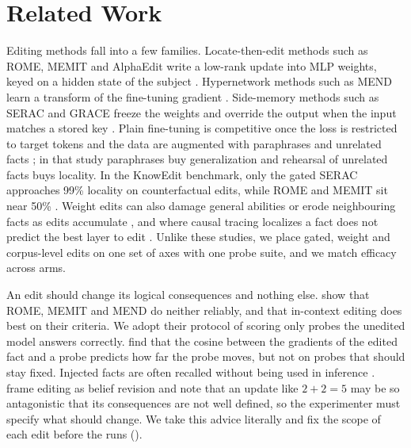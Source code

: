 \section{Related Work}
\label{sec:related}

Editing methods fall into a few families.
Locate-then-edit methods such as ROME, MEMIT and AlphaEdit write a low-rank update into MLP weights, keyed on a hidden state of the subject \citep{meng2022rome,meng2023memit,fang2025alphaedit}.
Hypernetwork methods such as MEND learn a transform of the fine-tuning gradient \citep{mitchell2022mend}.
Side-memory methods such as SERAC and GRACE freeze the weights and override the output when the input matches a stored key \citep{mitchell2022serac,hartvigsen2023grace}.
Plain fine-tuning is competitive once the loss is restricted to target tokens and the data are augmented with paraphrases and unrelated facts \citep{gangadhar2024finetuning}; in that study paraphrases buy generalization and rehearsal of unrelated facts buys locality.
In the KnowEdit benchmark, only the gated SERAC approaches 99\% locality on counterfactual edits, while ROME and MEMIT sit near 50\% \citep{zhang2024knowedit}.
Weight edits can also damage general abilities or erode neighbouring facts as edits accumulate \citep{gupta2024catastrophic,yang2024butterfly,gu2024harms}, and where causal tracing localizes a fact does not predict the best layer to edit \citep{hase2023localization}.
Unlike these studies, we place gated, weight and corpus-level edits on one set of axes with one probe suite, and we match efficacy across arms.

An edit should change its logical consequences and nothing else.
\citet{cohen2024ripple} show that ROME, MEMIT and MEND do neither reliably, and that in-context editing does best on their criteria.
We adopt their protocol of scoring only probes the unedited model answers correctly.
\citet{qin2024ripple} find that the cosine between the gradients of the edited fact and a probe predicts how far the probe moves, but not on probes that should stay fixed.
Injected facts are often recalled without being used in inference \citep{onoe2023entities,zhong2023mquake}.
\citet{hase2024fundamental} frame editing as belief revision and note that an update like $2+2=5$ may be so antagonistic that its consequences are not well defined, so the experimenter must specify what should change.
We take this advice literally and fix the scope of each edit before the runs ().

